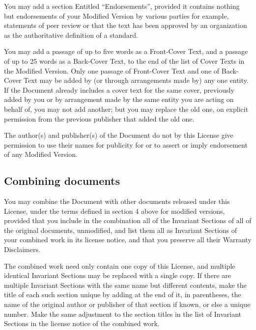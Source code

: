 {\tiny{}You may add a section Entitled \textsf{``}Endorsements\textsf{''}, provided
it contains nothing but endorsements of your Modified Version by various
parties \textemdash{} for example, statements of peer review or that
the text has been approved by an organization as the authoritative
definition of a standard.}{\tiny\par}

{\tiny{}You may add a passage of up to five words as a Front-Cover
Text, and a passage of up to 25 words as a Back-Cover Text, to the
end of the list of Cover Texts in the Modified Version. Only one passage
of Front-Cover Text and one of Back-Cover Text may be added by (or
through arrangements made by) any one entity. If the Document already
includes a cover text for the same cover, previously added by you
or by arrangement made by the same entity you are acting on behalf
of, you may not add another; but you may replace the old one, on explicit
permission from the previous publisher that added the old one.}{\tiny\par}

{\tiny{}The author(s) and publisher(s) of the Document do not by this
License give permission to use their names for publicity for or to
assert or imply endorsement of any Modified Version.}{\tiny\par}

\subsection*{{\tiny{}Combining documents}}

{\tiny{}You may combine the Document with other documents released
under this License, under the terms defined in section 4 above for
modified versions, provided that you include in the combination all
of the Invariant Sections of all of the original documents, unmodified,
and list them all as Invariant Sections of your combined work in its
license notice, and that you preserve all their Warranty Disclaimers.}{\tiny\par}

{\tiny{}The combined work need only contain one copy of this License,
and multiple identical Invariant Sections may be replaced with a single
copy. If there are multiple Invariant Sections with the same name
but different contents, make the title of each such section unique
by adding at the end of it, in parentheses, the name of the original
author or publisher of that section if known, or else a unique number.
Make the same adjustment to the section titles in the list of Invariant
Sections in the license notice of the combined work.}{\tiny\par}

